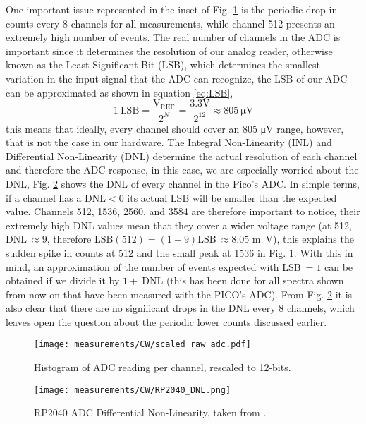 One important issue represented in the inset of Fig. \ref{fig:CW_scaled} is the periodic drop in counts every 8 channels for all measurements, while channel 512 presents an extremely high number of events. The real number of channels in the ADC is important since it determines the resolution of our analog reader, otherwise known as the Least Significant Bit (LSB), which determines the smallest variation in the input signal that the ADC can recognize, the LSB of our ADC can be approximated as shown in equation \eqref{eq:LSB},
\begin{equation}\label{eq:LSB}
  1~\text{LSB} = \frac{\text{V}_\text{REF}}{2^N} = \frac{3.3 \unit{\V}}{2^{12}} \approx 805~\unit{\micro\V}
\end{equation}
this means that ideally, every channel should cover an 805 \unit{\micro\V} range, however, that is not the case in our hardware. The Integral Non-Linearity (INL) and Differential Non-Linearity (DNL) determine the actual resolution of each channel and therefore the ADC response, in this case, we are especially worried about the DNL, Fig. \ref{fig:RP2040_DNL} shows the DNL of every channel in the Pico's ADC. In simple terms, if a channel has a DNL$<0$ its actual LSB will be smaller than the expected value. Channels 512, 1536, 2560, and 3584 are therefore important to notice, their extremely high DNL values mean that they cover a wider voltage range (at 512, DNL$~\approx9$, therefore LSB$(512)=(1+9)$LSB$~\approx 8.05$ \unit{\m\V}), this explains the sudden spike in counts at 512 and the small peak at 1536 in Fig. \ref{fig:CW_scaled}. With this in mind, an approximation of the number of events expected with LSB$~=1$ can be obtained if we divide it by $1+~$DNL (this has been done for all spectra shown from now on that have been measured with the PICO's ADC). From Fig. \ref{fig:RP2040_DNL} it is also clear that there are no significant drops in the DNL every 8 channels, which leaves open the question about the periodic lower counts discussed earlier.

\begin{figure}
  \centering
  \texttt{[image: measurements/CW/scaled\_raw\_adc.pdf]}
  \caption{\label{fig:CW_scaled}Histogram of ADC reading per channel, rescaled to 12-bits.}
\end{figure}

\begin{figure}
  \centering
  \texttt{[image: measurements/CW/RP2040\_DNL.png]}
  \caption{\label{fig:RP2040_DNL}RP2040 ADC Differential Non-Linearity, taken from \cite{datasheet2024rp2040}.}
\end{figure}

